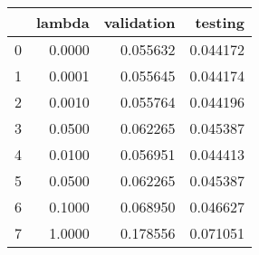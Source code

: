 \begin{tabular}{lrrr}
\toprule
{} &  lambda &  validation &   testing \\
\midrule
0 &  0.0000 &    0.055632 &  0.044172 \\
1 &  0.0001 &    0.055645 &  0.044174 \\
2 &  0.0010 &    0.055764 &  0.044196 \\
3 &  0.0500 &    0.062265 &  0.045387 \\
4 &  0.0100 &    0.056951 &  0.044413 \\
5 &  0.0500 &    0.062265 &  0.045387 \\
6 &  0.1000 &    0.068950 &  0.046627 \\
7 &  1.0000 &    0.178556 &  0.071051 \\
\bottomrule
\end{tabular}
